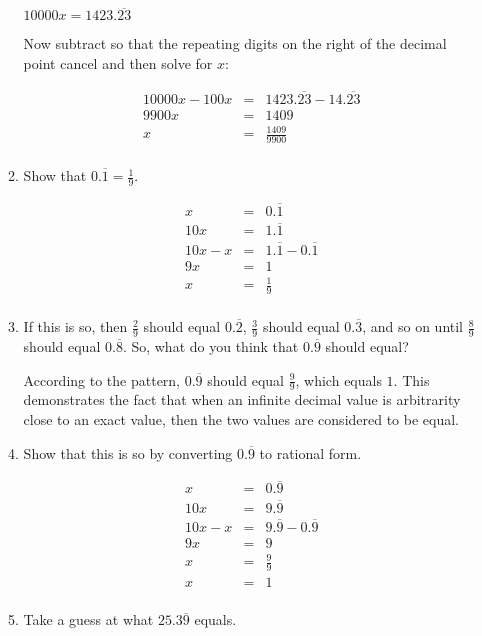 \documentclass[letterpaper,12pt,fleqn]{article}
\begin{document}
\begin{enumerate}
\begin{enumerate}
  $10000x=1423.\overline{23}$

  Now subtract so that the repeating digits on the right of the decimal point
  cancel and then solve for $x$:

  \begin{eqnarray*}
    10000x-100x &=& 1423.\overline{23} - 14.\overline{23} \\
    9900x &=& 1409 \\
    x &=& \frac{1409}{9900} \\
  \end{eqnarray*}

\item Show that $0.\overline{1} = \frac{1}{9}$.

  \begin{eqnarray*}
    x &=& 0.\overline{1} \\
    10x &=& 1.\overline{1} \\
    10x-x &=& 1.\overline{1}-0.\overline{1} \\
    9x &=& 1 \\
    x &=& \frac{1}{9} \\
  \end{eqnarray*}
  
\item If this is so, then $\frac{2}{9}$ should equal $0.\overline{2}$,
  $\frac{3}{9}$ should equal $0.\overline{3}$, and so on until $\frac{8}{9}$
  should equal $0.\overline{8}$. So, what do you think that $0.\overline{9}$
  should equal?

  According to the pattern, $0.\overline{9}$ should equal $\frac{9}{9}$, which
  equals $1$. This demonstrates the fact that when an infinite decimal value is
  arbitrarity close to an exact value, then the two values are considered to be
  equal.
\newpage
\item Show that this is so by converting $0.\overline{9}$ to rational form.

  \begin{eqnarray*}
    x &=& 0.\overline{9} \\
    10x &=& 9.\overline{9} \\
    10x-x &=& 9.\overline{9}-0.\overline{9} \\
    9x &=& 9 \\
    x &=& \frac{9}{9} \\
    x &=& 1 \\
  \end{eqnarray*}
  
\item Take a guess at what $25.3\overline{9}$ equals.


\end{enumerate}
\end{enumerate}
\end{document}
